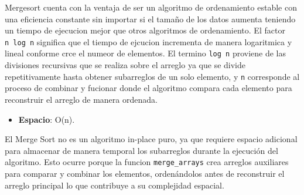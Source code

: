 \documentclass[
  spanish,
  letterpaper,
  DIV=11,
  numbers=noendperiod]{scrreprt}
\providecommand{\tightlist}{%
  \setlength{\itemsep}{0pt}\setlength{\parskip}{0pt}}
\begin{document}
\begin{tcolorbox}[enhanced jigsaw, arc=.35mm, bottomrule=.15mm, bottomtitle=1mm, breakable, colback=white, colbacktitle=quarto-callout-note-color!10!white, colframe=quarto-callout-note-color-frame, coltitle=black, left=2mm, leftrule=.75mm, opacityback=0, opacitybacktitle=0.6, rightrule=.15mm, title=\textcolor{quarto-callout-note-color}{\faInfo}\hspace{0.5em}{Importante}, titlerule=0mm, toprule=.15mm, toptitle=1mm]

Mergesort cuenta con la ventaja de ser un algoritmo de ordenamiento
estable con una eficiencia constante sin importar si el tamaño de los
datos aumenta teniendo un tiempo de ejecucion mejor que otros algoritmos
de ordenamiento. El factor \texttt{n\ log\ n} significa que el tiempo de
ejcucion incrementa de manera logaritmica y lineal conforme crce el
numeor de elementos. El termino \texttt{log\ n} proviene de las
divisiones recursivas que se realiza sobre el arreglo ya que se divide
repetitivamente hasta obtener subarreglos de un solo elemento, y
\texttt{n} corresponde al proceso de combinar y fucionar donde el
algoritmo compara cada elemento para reconstruir el arreglo de manera
ordenada.

\end{tcolorbox}

\begin{itemize}
\tightlist
\item
  \textbf{Espacio}: O(n).
\end{itemize}

\begin{tcolorbox}[enhanced jigsaw, arc=.35mm, bottomrule=.15mm, bottomtitle=1mm, breakable, colback=white, colbacktitle=quarto-callout-note-color!10!white, colframe=quarto-callout-note-color-frame, coltitle=black, left=2mm, leftrule=.75mm, opacityback=0, opacitybacktitle=0.6, rightrule=.15mm, title=\textcolor{quarto-callout-note-color}{\faInfo}\hspace{0.5em}{Importante}, titlerule=0mm, toprule=.15mm, toptitle=1mm]

El Merge Sort no es un algoritmo in-place puro, ya que requiere espacio
adicional para almacenar de manera temporal los subarreglos durante la
ejecución del algoritmo. Esto ocurre porque la funcion
\texttt{merge\_arrays} crea arreglos auxiliares para comparar y combinar
los elementos, ordenándolos antes de reconstruir el arreglo principal lo
que contribuye a su complejidad espacial.

\end{tcolorbox}
\end{document}
